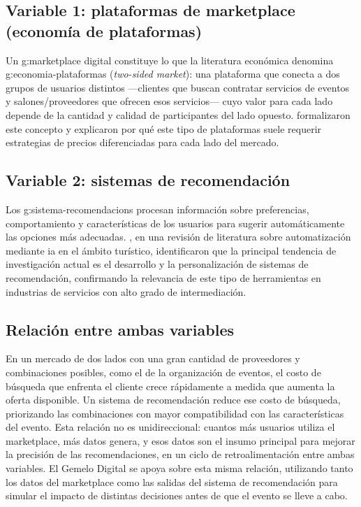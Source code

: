 \subsection{Variable 1: plataformas de marketplace (economía de plataformas)}

Un \gls{g:marketplace} digital constituye lo que la literatura económica
denomina \gls{g:economia-plataformas} (\emph{two-sided market}): una
plataforma que conecta a dos grupos de usuarios distintos ---clientes que
buscan contratar servicios de eventos y salones/proveedores que ofrecen
esos servicios--- cuyo valor para cada lado depende de la cantidad y
calidad de participantes del lado opuesto. \citet{rochettirole2006}
formalizaron este concepto y explicaron por qué este tipo de plataformas
suele requerir estrategias de precios diferenciadas para cada lado del
mercado.

\subsection{Variable 2: sistemas de recomendación}

Los \glspl{g:sistema-recomendacion} procesan información sobre
preferencias, comportamiento y características de los usuarios para
sugerir automáticamente las opciones más adecuadas. \citet{riveroetal2025},
en una revisión de literatura sobre automatización mediante \gls{ia} en
el ámbito turístico, identificaron que la principal tendencia de
investigación actual es el desarrollo y la personalización de sistemas de
recomendación, confirmando la relevancia de este tipo de herramientas en
industrias de servicios con alto grado de intermediación.

\subsection{Relación entre ambas variables}

En un mercado de dos lados con una gran cantidad de proveedores y
combinaciones posibles, como el de la organización de eventos, el costo
de búsqueda que enfrenta el cliente crece rápidamente a medida que
aumenta la oferta disponible. Un sistema de recomendación reduce ese costo de búsqueda, priorizando las combinaciones con
mayor compatibilidad con las características del evento. Esta relación
no es unidireccional: cuantos más usuarios utiliza el marketplace, más
datos genera, y esos datos son el insumo principal para mejorar la
precisión de las recomendaciones, en un ciclo de retroalimentación entre
ambas variables. El Gemelo Digital se apoya sobre esta misma relación,
utilizando tanto los datos del marketplace como las salidas del sistema
de recomendación para simular el impacto de distintas decisiones antes de
que el evento se lleve a cabo.

